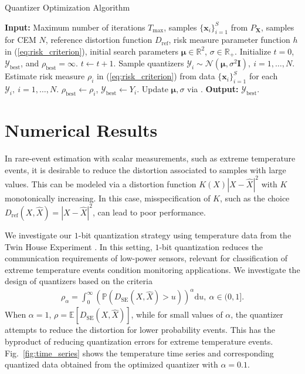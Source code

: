 \documentclass[journal]{IEEEtran}
\begin{document}
\begin{algorithm}
	\caption{Quantizer Optimization Algorithm}\label{alg:optimization}
	\begin{algorithmic}[1]
		\STATE \textbf{Input:} Maximum number of iterations $T_{\max}$, samples  $\{\mathbf{x}_i\}_{i=1}^S$ from $P_{\mathbf{X}}$, samples for CEM $N$, reference distortion function $D_{\mathrm{ref}}$, risk measure parameter function $h$ in (\ref{eq:risk_criterion}), initial search parameters $\boldsymbol{\mu} \in \mathbb{R}^2$, $\sigma \in \mathbb{R}_+$. \STATE Initialize $t = 0$, $\mathcal{Y}_{\mathrm{best}}$, and $\rho_{\mathrm{best}} = \infty$. 
		\STATE $t \leftarrow t+1$.
		\STATE Sample quantizers $\mathcal{Y}_i \sim \mathcal{N}(\boldsymbol{\mu},\sigma^2\mathbf{I}),~i = 1,\ldots,N$.
		\STATE Estimate risk measure $\rho_i$ in (\ref{eq:risk_criterion}) from data $\{\mathbf{x}_i\}_{i=1}^S$ for each $\mathcal{Y}_i,~i = 1,\ldots,N$.
		\STATE $\rho_{\mathrm{best}} \leftarrow \rho_i$, $\mathcal{Y}_{\mathrm{best}} \leftarrow Y_i$.
		\ENDIF
		\STATE Update $\boldsymbol{\mu},\sigma$ via \cite[Algorithm 4.1 Eq. (19-21)]{Botev2013cross}.
		\ENDFOR
		\ENDFOR
		\STATE \textbf{Output:} $\mathcal{Y}_{\mathrm{best}}$.
	\end{algorithmic}
\end{algorithm}

\section{Numerical Results}

In rare-event estimation with scalar measurements, such as extreme temperature events, it is desirable to reduce the distortion associated to samples with large values. This can be modeled via a distortion function $K(X)|X - \hat{X}|^2$ with $K$ monotonically increasing. In this case, misspecification of $K$, such as the choice $D_{\mathrm{ref}}(X,\hat{X}) = |X - \hat{X}|^2$, can lead to poor performance.

We investigate our $1$-bit quantization strategy using temperature data from the Twin House Experiment \cite{Kersken2020}. In this setting, $1$-bit quantization reduces the communication requirements of low-power sensors, relevant for classification of extreme temperature events condition monitoring applications. We investigate the design of quantizers based on the criteria 
\begin{align}\label{eq:risk_power}
	\rho_{\alpha} = \int_0^{\infty} \left(\mathbb{P}(D_{\mathrm{SE}}(X,\hat{X}) > u)\right)^{\alpha}\mathrm{d}u,~\alpha \in (0,1].
\end{align} 
When $\alpha = 1$, $\rho = \mathbb{E}[D_{\mathrm{SE}}(X,\hat{X})]$, while for small values of $\alpha$, the quantizer attempts to reduce the distortion for lower probability events. This has the byproduct of reducing quantization errors for extreme temperature events. Fig.~\ref{fig:time_series} shows the temperature time series and corresponding quantized data obtained from the optimized quantizer with $\alpha = 0.1$.
\end{document}
